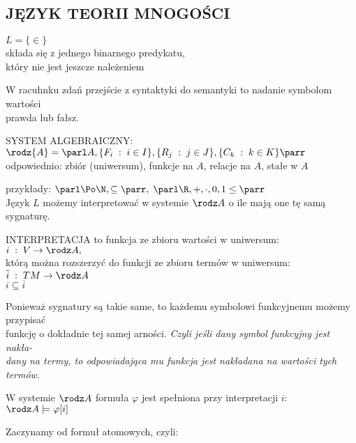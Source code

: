 \subsection{JĘZYK TEORII MNOGOŚCI}
\begin{center}\large
    {\color{def}$L=\{\in\}$}\smallskip\\
    składa się z jednego binarnego predykatu, \\który nie jest jeszcze należeniem
\end{center}\bigskip
W racuhnku zdań przejście z syntaktyki do semantyki to nadanie symbolom wartości \\prawda lub fałsz.\bigskip
\begin{center}\large
    {\color{def}SYSTEM ALGEBRAICZNY:}\smallskip\\
    {\color{emp}$\rodz{A}=\parl A,\{F_i\;:\;i\in I\},\{R_j\;:\;j\in J\},\{C_k\;:\;k\in K\}\parr$}\smallskip\\
    {\normalsize odpowiednio: zbiór (uniwersum), funkcje na $A$, relacje na $A$, stałe w $A$}
\end{center}\medskip
przykłady: $\parl \Po\N,\subseteq\parr, \;\parl \R, +, \cdot, 0, 1\leq\parr$\bigskip\\
Język $L$ możemy interpretować w systemie $\rodz A$ o ile mają one tę samą sygnaturę.\bigskip
\begin{center}\large
    {\color{def}INTERPRETACJA} to funkcja ze zbioru wartości w uniwersum:\smallskip\\
    $i\;:\;V\to \rodz A,$\smallskip\\
    którą można rozszerzyć do funkcji ze zbioru termów w uniwersum:\smallskip\\
    $\overline i \;:\;TM\to \rodz A$\\
    $i\subseteq \overline i$
\end{center}\bigskip
Ponieważ sygnatury są takie same, to każdemu symbolowi funkcyjnemu możemy przypisać \\funkcję o dokładnie tej samej arności. \emph{Czyli jeśli dany symbol funkcyjny jest nakła-\\dany na termy, to odpowiadająca mu funkcja jest nakładana na wartości tych termów.}\bigskip
\begin{center}\large
    {\color{emp}W systemie $\rodz A$ formuła $\varphi$ jest spełniona przy interpretacji $i$:}\smallskip\\
    $\rodz A \models \varphi[i]$
\end{center}\bigskip
Zaczynamy od formuł atomowych, czyli:\medskip\\
